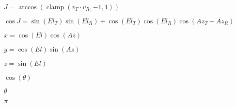 \documentclass{article}
\begin{document}
$J = \arccos(\operatorname{clamp}(v_T\cdot v_R, -1, 1))$
\pagebreak

$\cos J = \sin(El_T)\sin(El_R) + \cos(El_T)\cos(El_R)\cos(Az_T - Az_R)$
\pagebreak

$x = \cos(El)\cos(Az)$
\pagebreak

$y = \cos(El)\sin(Az)$
\pagebreak

$z = \sin(El)$
\pagebreak

$\cos(\theta)$
\pagebreak

$\theta$
\pagebreak

$\pi$
\pagebreak
\end{document}
